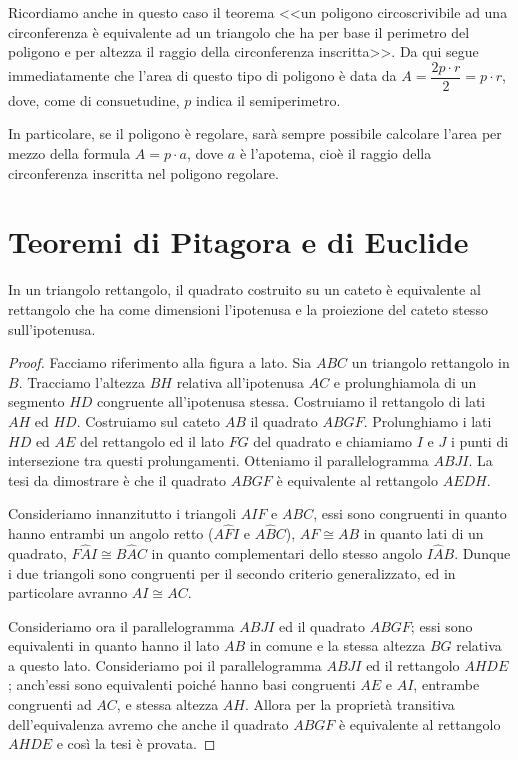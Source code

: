 Ricordiamo anche in questo caso il teorema <<un poligono circoscrivibile ad una circonferenza è equivalente ad un triangolo che ha per base il perimetro del poligono e per altezza il raggio della circonferenza inscritta>>. 
Da qui segue immediatamente che l'area di questo tipo di poligono è data da $A=\dfrac{2p\cdot r}{2}=p\cdot r$, dove, come di consuetudine, $p$ indica il semiperimetro.

In particolare, se il poligono è regolare, sarà sempre possibile calcolare l'area per mezzo della formula $A=p\cdot a$, dove $a$ è l'apotema, cioè il raggio della circonferenza inscritta nel poligono regolare.

\section{Teoremi di Pitagora e di Euclide}

\begin{teorema}
In un triangolo rettangolo, il quadrato costruito su un cateto è equivalente al rettangolo che ha come dimensioni l'ipotenusa e la proiezione del cateto stesso sull'ipotenusa.
\end{teorema}

\begin{proof}
Facciamo riferimento alla figura a lato.
Sia $ABC$ un triangolo rettangolo in $B$. Tracciamo l'altezza $BH$ relativa all'ipotenusa $AC$ e prolunghiamola di un segmento $HD$ congruente all'ipotenusa stessa.
Costruiamo il rettangolo di lati $AH$ ed $HD$. Costruiamo sul cateto $AB$ il quadrato $ABGF$. Prolunghiamo i lati $HD$ ed $AE$ del rettangolo ed il lato $FG$ del quadrato e chiamiamo $I$ e $J$ i punti di intersezione tra questi prolungamenti. Otteniamo il parallelogramma $ABJI$.
La tesi da dimostrare è che il quadrato $ABGF$ è equivalente al rettangolo $AEDH$.

Consideriamo innanzitutto i triangoli $AIF$ e $ABC$, essi sono congruenti in quanto hanno entrambi un angolo retto ($A\widehat{F}I$ e $A\widehat{B}C$), $AF\cong AB$ in quanto lati di un quadrato, $F\widehat{A}I\cong B\widehat{A}C$ in quanto complementari dello stesso angolo $I\widehat{A}B$.
Dunque i due triangoli sono congruenti per il secondo criterio generalizzato, ed in particolare avranno $AI\cong AC$.

Consideriamo ora il parallelogramma $ABJI$ ed il quadrato $ABGF$; essi sono equivalenti in quanto hanno il lato $AB$ in comune e la stessa altezza $BG$ relativa a questo lato. 
Consideriamo poi il parallelogramma $ABJI$ ed il rettangolo $AHDE$; anch'essi sono equivalenti poiché hanno basi congruenti $AE$ e $AI$, entrambe congruenti ad $AC$, e stessa altezza $AH$.
Allora per la proprietà transitiva dell'equivalenza avremo che anche il quadrato $ABGF$ è equivalente al rettangolo $AHDE$ e così la tesi è provata.
\end{proof}

